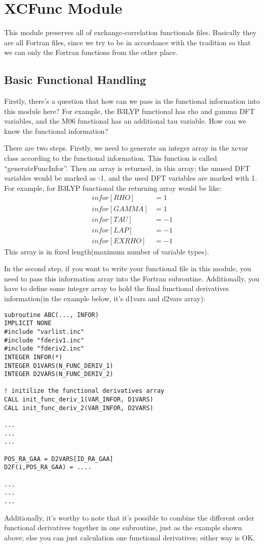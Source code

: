 \chapter{XCFunc Module}
\label{xcfunc}

This module preserves all of exchange-correlation 
functionals files. Basically they are all Fortran files,
since we try to be in accordance with the tradition
so that we can only the Fortran functions from the 
other place.

\section{Basic Functional Handling}

Firstly, there's a question that how can we pass in
the functional information into this module here?
For example, the B3LYP functional has rho and gamma
DFT variables, and the M06 functional has an additional
tau variable. How can we know the functional 
information?

There are two steps. Firstly, we need to generate
an integer array in the xcvar class according 
to the functional information. This function is 
called ``generateFuncInfor''. Then an array is 
returned, in this array; the unused DFT variables
would be marked as -1, and the used DFT variables
are marked with 1. For example, for B3LYP functional
the returning array would be like:
\begin{align}
 infor[RHO]   &= 1 \nonumber \\ 
 infor[GAMMA] &= 1 \nonumber \\ 
 infor[TAU]   &=-1 \nonumber \\ 
 infor[LAP]   &=-1 \nonumber \\ 
 infor[EXRHO] &=-1 
\end{align}
This array is in fixed length(maximum number of variable
types).

In the second step, if you want to write your functional file 
in this module, you need to pass this information array 
into the Fortran subroutine. Additionally, you have 
to define some integer array to hold the final
functional derivatives information(in the example below,
it's d1vars and d2vars array):
\begin{verbatim}
subroutine ABC(..., INFOR)
IMPLICIT NONE
#include "varlist.inc"
#include "fderiv1.inc"
#include "fderiv2.inc"
INTEGER INFOR(*)
INTEGER D1VARS(N_FUNC_DERIV_1)
INTEGER D2VARS(N_FUNC_DERIV_2)

! initilize the functional derivatives array
CALL init_func_deriv_1(VAR_INFOR, D1VARS)
CALL init_func_deriv_2(VAR_INFOR, D2VARS)

...
...
...

POS_RA_GAA = D2VARS[ID_RA_GAA]
D2F(i,POS_RA_GAA) = ....

...
...
...
\end{verbatim}
Additionally, it's worthy to note that it's possible to 
combine the different order functional derivatives together
in one subroutine, just as the example shown above; else
you can just calculation one functional derivatives; either 
way is OK.

